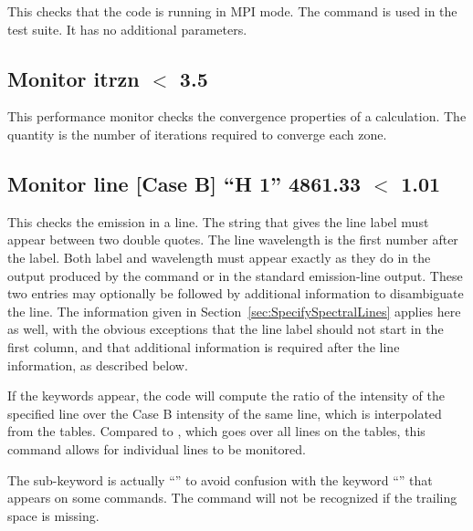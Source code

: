 This checks that the code is running in MPI mode. The command is used
in the  test suite. It has no additional parameters.

\subsection{Monitor itrzn $<$ 3.5}

This performance monitor checks the convergence properties of a calculation.
The quantity
is the number of iterations required to converge each zone.

\subsection{Monitor line [Case B] ``H  1'' 4861.33 $<$ 1.01}

This checks the emission in a line.
The string that gives the line label must appear between
two double quotes.
The line wavelength is the first number after the label.
Both label and wavelength must appear exactly as they do in the output
produced by the  command or
in the standard emission-line output. These two entries may optionally
be followed by additional information to disambiguate the line.
The information given in Section~\ref{sec:SpecifySpectralLines} applies
here as well, with the obvious exceptions that the line label should
not start in the first column, and that additional information is
required after the line information, as described below.

If the keywords  appear,
the code will compute the ratio of the intensity of the specified line
over the Case B intensity of the same line, which is interpolated from
the \citet{Storey1995} tables.
Compared to ,
which goes over all lines on the tables,
this command allows for individual lines to be monitored.

The sub-keyword is actually ``'' to avoid
confusion with the keyword ``'' that appears
on some commands.
The command will not be recognized if the trailing space is missing.


